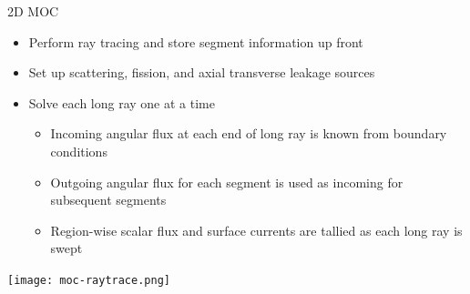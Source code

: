 \begin{frame}[t]{2D MOC}
  
    \vspace{-10pt}
      \begin{itemize}
        \item Perform ray tracing and store segment information up front
        \item Set up scattering, fission, and axial transverse leakage sources
        \item Solve each long ray one at a time
        \begin{itemize}
            \item Incoming angular flux at each end of long ray is known from boundary conditions
            \item Outgoing angular flux for each segment is used as incoming for subsequent segments
            \item Region-wise scalar flux and surface currents are tallied as each long ray is swept
        \end{itemize}
      \end{itemize}
  \begin{center}
      \texttt{[image: moc-raytrace.png]}
  \end{center}

\end{frame}